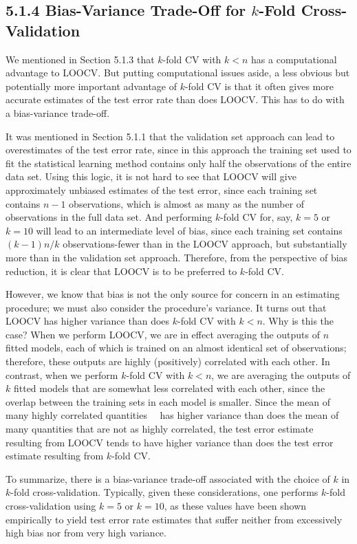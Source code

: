 \documentclass[10pt]{article}
\begin{document}
\subsection*{5.1.4 Bias-Variance Trade-Off for $k$-Fold Cross-Validation}
We mentioned in Section 5.1.3 that $k$-fold CV with $k<n$ has a computational advantage to LOOCV. But putting computational issues aside, a less obvious but potentially more important advantage of $k$-fold CV is that it often gives more accurate estimates of the test error rate than does LOOCV. This has to do with a bias-variance trade-off.

It was mentioned in Section 5.1.1 that the validation set approach can lead to overestimates of the test error rate, since in this approach the training set used to fit the statistical learning method contains only half the observations of the entire data set. Using this logic, it is not hard to see that LOOCV will give approximately unbiased estimates of the test error, since each training set contains $n-1$ observations, which is almost as many as the number of observations in the full data set. And performing $k$-fold CV for, say, $k=5$ or $k=10$ will lead to an intermediate level of bias, since each training set contains $(k-1) n / k$ observations-fewer than in the LOOCV approach, but substantially more than in the validation set approach. Therefore, from the perspective of bias reduction, it is clear that LOOCV is to be preferred to $k$-fold CV.

However, we know that bias is not the only source for concern in an estimating procedure; we must also consider the procedure's variance. It turns out that LOOCV has higher variance than does $k$-fold CV with $k<n$. Why is this the case? When we perform LOOCV, we are in effect averaging the outputs of $n$ fitted models, each of which is trained on an almost identical set of observations; therefore, these outputs are highly (positively) correlated with each other. In contrast, when we perform $k$-fold CV with $k<n$, we are averaging the outputs of $k$ fitted models that are somewhat less correlated with each other, since the overlap between the training sets in each model is smaller. Since the mean of many highly correlated quantities\
\
has higher variance than does the mean of many quantities that are not as highly correlated, the test error estimate resulting from LOOCV tends to have higher variance than does the test error estimate resulting from $k$-fold CV.

To summarize, there is a bias-variance trade-off associated with the choice of $k$ in $k$-fold cross-validation. Typically, given these considerations, one performs $k$-fold cross-validation using $k=5$ or $k=10$, as these values have been shown empirically to yield test error rate estimates that suffer neither from excessively high bias nor from very high variance.
\end{document}
